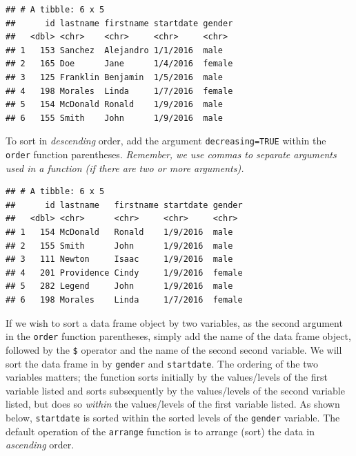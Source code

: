 \documentclass[]{book}
\newenvironment{Shaded}{\begin{snugshade}}{\end{snugshade}}
\newcommand{\KeywordTok}[1]{\textcolor[rgb]{0.13,0.29,0.53}{\textbf{#1}}}
\newcommand{\DataTypeTok}[1]{\textcolor[rgb]{0.13,0.29,0.53}{#1}}
\newcommand{\StringTok}[1]{\textcolor[rgb]{0.31,0.60,0.02}{#1}}
\newcommand{\CommentTok}[1]{\textcolor[rgb]{0.56,0.35,0.01}{\textit{#1}}}
\newcommand{\OtherTok}[1]{\textcolor[rgb]{0.56,0.35,0.01}{#1}}
\newcommand{\OperatorTok}[1]{\textcolor[rgb]{0.81,0.36,0.00}{\textbf{#1}}}
\newcommand{\NormalTok}[1]{#1}
\begin{document}
\begin{verbatim}
## # A tibble: 6 x 5
##      id lastname firstname startdate gender
##   <dbl> <chr>    <chr>     <chr>     <chr> 
## 1   153 Sanchez  Alejandro 1/1/2016  male  
## 2   165 Doe      Jane      1/4/2016  female
## 3   125 Franklin Benjamin  1/5/2016  male  
## 4   198 Morales  Linda     1/7/2016  female
## 5   154 McDonald Ronald    1/9/2016  male  
## 6   155 Smith    John      1/9/2016  male
\end{verbatim}

To sort in \emph{descending} order, add the argument
\texttt{decreasing=TRUE} within the \texttt{order} function parentheses.
\emph{Remember, we use commas to separate arguments used in a function
(if there are two or more arguments).}

\begin{Shaded}
\end{Shaded}

\begin{verbatim}
## # A tibble: 6 x 5
##      id lastname   firstname startdate gender
##   <dbl> <chr>      <chr>     <chr>     <chr> 
## 1   154 McDonald   Ronald    1/9/2016  male  
## 2   155 Smith      John      1/9/2016  male  
## 3   111 Newton     Isaac     1/9/2016  male  
## 4   201 Providence Cindy     1/9/2016  female
## 5   282 Legend     John      1/9/2016  male  
## 6   198 Morales    Linda     1/7/2016  female
\end{verbatim}

If we wish to sort a data frame object by two variables, as the second
argument in the \texttt{order} function parentheses, simply add the name
of the data frame object, followed by the \texttt{\$} operator and the
name of the second second variable. We will sort the data frame in by
\texttt{gender} and \texttt{startdate}. The ordering of the two
variables matters; the function sorts initially by the values/levels of
the first variable listed and sorts subsequently by the values/levels of
the second variable listed, but does so \emph{within} the values/levels
of the first variable listed. As shown below, \texttt{startdate} is
sorted within the sorted levels of the \texttt{gender} variable. The
default operation of the \texttt{arrange} function is to arrange (sort)
the data in \emph{ascending} order.
\end{document}
